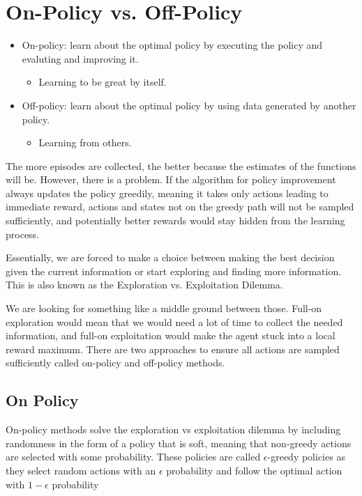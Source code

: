 \section{On-Policy vs. Off-Policy}
\begin{itemize}
	\item On-policy: learn about the optimal policy by executing the policy and evaluting and improving it.  
		\begin{itemize}
			\item Learning to be great by itself.
		\end{itemize}
	\item Off-policy: learn about the optimal policy by using data generated by another policy. 
		\begin{itemize}
			\item Learning from others.
		\end{itemize}
\end{itemize}

The more episodes are collected, the better because the estimates of the functions will be. However, there is a problem. If the algorithm for policy improvement always updates the policy greedily, meaning it takes only actions leading to immediate reward, actions and states not on the greedy path will not be sampled sufficiently, and potentially better rewards would stay hidden from the learning process.

Essentially, we are forced to make a choice between making the best decision given the current information or start exploring and finding more information. This is also known as the Exploration vs. Exploitation Dilemma.

We are looking for something like a middle ground between those. Full-on exploration would mean that we would need a lot of time to collect the needed information, and full-on exploitation would make the agent stuck into a local reward maximum. There are two approaches to ensure all actions are sampled sufficiently called on-policy and off-policy methods.



\subsection{On Policy}
On-policy methods solve the exploration vs exploitation dilemma by including randomness in the form of a policy that is soft, meaning that non-greedy actions are selected with some probability. These policies are called $\epsilon$-greedy policies as they select random actions with an $\epsilon$ probability and follow the optimal action with $1-\epsilon$ probability

